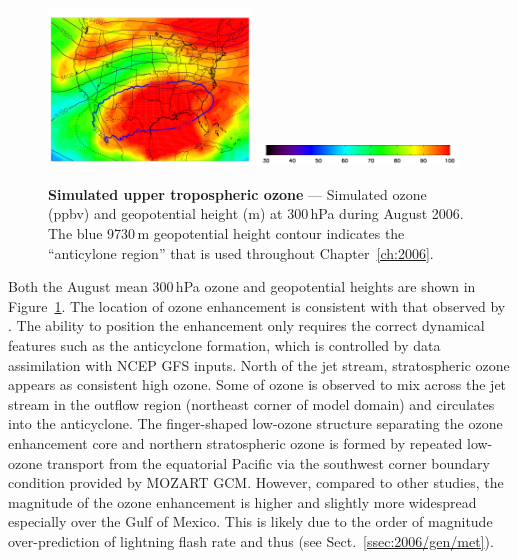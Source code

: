 	\begin{figure}
		\centering
		\begin{singlespacing}
		\vspace{-.35in}
		\includegraphics[width=0.48\textwidth]{o3/o308_300hPa}
		\includegraphics[width=0.48\textwidth]{o3/o3_colorbar}
		\caption[Simulated August ozone at 300\,\unit{hPa}]{{\small\textbf{Simulated upper tropospheric ozone} --- Simulated ozone
		(\unit{ppbv}) and geopotential height (\unit{m}) at 300\,\unit{hPa} during August 2006. The blue 9730\,\unit{m} geopotential
		height contour indicates the ``anticylone region'' that is used throughout Chapter~\ref{ch:2006}.}}
		\label{fig:2006/o3_300}
		\end{singlespacing}
	\end{figure}

Both the August mean 300\,\unit{hPa} ozone and geopotential heights are shown in Figure~\ref{fig:2006/o3_300}.
The location of ozone enhancement is consistent with that observed by \citet{Cooper:2007cr}. The ability to position the enhancement
only requires the correct dynamical features such as the anticyclone formation, which is controlled by data assimilation with NCEP
GFS inputs. North of the jet stream, stratospheric ozone appears as consistent high ozone. Some of ozone is observed to mix across
the jet stream in the outflow region (northeast corner of model domain) and circulates into the anticyclone. The finger-shaped low-ozone
structure separating the ozone enhancement core and northern stratospheric ozone is formed by repeated low-ozone transport from
the equatorial Pacific via the southwest corner boundary condition provided by MOZART GCM. However, compared to other studies,
the magnitude of the ozone enhancement is higher and slightly more widespread especially over the Gulf of Mexico. This is likely
due to the order of magnitude over-prediction of lightning flash rate and thus {\lnox} (see Sect.~\ref{ssec:2006/gen/met}).

